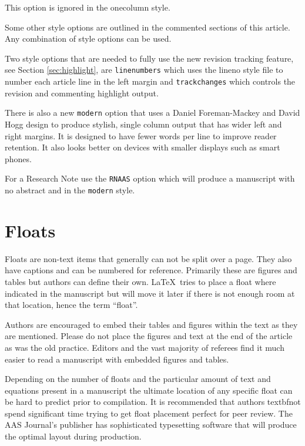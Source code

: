 \documentclass{aastex62}
\newcommand\latex{La\TeX}
\begin{document}
\noindent This option is ignored in the onecolumn style.

Some other style options are outlined in the commented sections of this 
article.  Any combination of style options can be used.

Two style options that are needed to fully use the new revision tracking
feature, see Section \ref{sec:highlight}, are {\tt\string linenumbers} which 
uses the lineno style file to number each article line in the left margin and 
{\tt\string trackchanges} which controls the revision and commenting highlight
output.

There is also a new {\tt\string modern} option that uses a Daniel
Foreman-Mackey and David Hogg design to produce stylish, single column
output that has wider left and right margins. It is designed to have fewer
words per line to improve reader retention. It also looks better on devices
with smaller displays such as smart phones.

For a Research Note use the {\tt\string RNAAS} option which will produce a
manuscript with no abstract and in the {\tt\string modern} style.

\section{Floats} \label{sec:floats}

Floats are non-text items that generally can not be split over a page.
They also have captions and can be numbered for reference.  Primarily these
are figures and tables but authors can define their own. \latex\ tries to
place a float where indicated in the manuscript but will move it later if
there is not enough room at that location, hence the term ``float''.

Authors are encouraged to embed their tables and figures within the text as
they are mentioned.  Please do not place the figures and text at the end of
the article as was the old practice.  Editors and the vast majority of
referees find it much easier to read a manuscript with embedded figures and
tables.

Depending on the number of floats and the particular amount of text and
equations present in a manuscript the ultimate location of any specific
float can be hard to predict prior to compilation. It is recommended that
authors textbf{not} spend significant time trying to get float placement
perfect for peer review.  The AAS Journal's publisher has sophisticated
typesetting software that will produce the optimal layout during
production.
\end{document}
